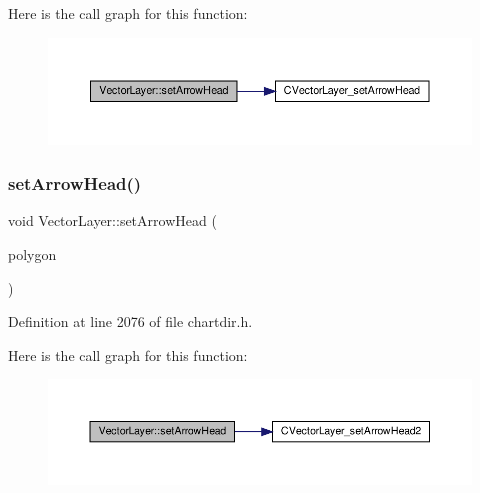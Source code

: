 Here is the call graph for this function\+:
\nopagebreak
\begin{figure}[H]
\begin{center}
\leavevmode
\includegraphics[width=350pt]{class_vector_layer_af42ed822026b94b28c4d154018eb9a1f_cgraph}
\end{center}
\end{figure}
\mbox{\label{class_vector_layer_a76baffd0a97951dadbb8a98b7ea27fbd}} 
\subsubsection{\texorpdfstring{set\+Arrow\+Head()}{setArrowHead()}\hspace{0.1cm}{\footnotesize\ttfamily [2/2]}}
{\footnotesize\ttfamily void Vector\+Layer\+::set\+Arrow\+Head (\begin{DoxyParamCaption}\item[{\hyperlink{class_int_array}{Int\+Array}}]{polygon }\end{DoxyParamCaption})\hspace{0.3cm}{\ttfamily [inline]}}



Definition at line 2076 of file chartdir.\+h.

Here is the call graph for this function\+:
\nopagebreak
\begin{figure}[H]
\begin{center}
\leavevmode
\includegraphics[width=350pt]{class_vector_layer_a76baffd0a97951dadbb8a98b7ea27fbd_cgraph}
\end{center}
\end{figure}
\mbox{\label{class_vector_layer_a776738058950abe1f23bc38c192b5553}} 

